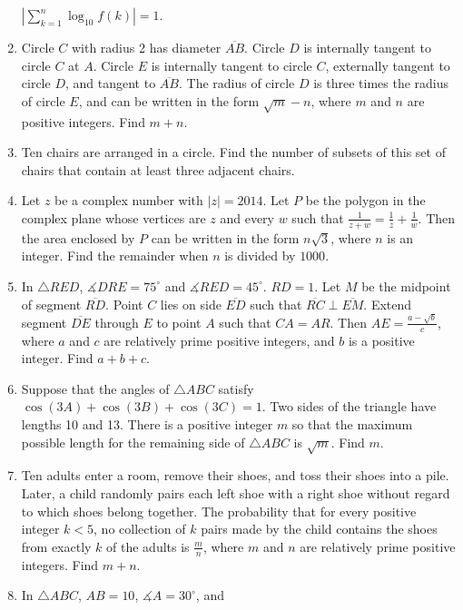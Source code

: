 \documentclass{article}
\begin{document}
\begin{enumerate}[label=\arabic*., itemsep=0.5em]
\(\left |\sum_{k=1}^n\log_{10}f(k)\right|=1.\)\par \vspace{0.5em}\item Circle \(C\) with radius 2 has diameter \(\overline{AB}\). Circle \(D\) is internally tangent to circle \(C\) at \(A\). Circle \(E\) is internally tangent to circle \(C\), externally tangent to circle \(D\), and tangent to \(\overline{AB}\). The radius of circle \(D\) is three times the radius of circle \(E\), and can be written in the form \(\sqrt{m}-n\), where \(m\) and \(n\) are positive integers. Find \(m+n\).\par \vspace{0.5em}\item Ten chairs are arranged in a circle. Find the number of subsets of this set of chairs that contain at least three adjacent chairs.\par \vspace{0.5em}\item Let \(z\) be a complex number with \(|z|=2014\). Let \(P\) be the polygon in the complex plane whose vertices are \(z\) and every \(w\) such that \(\frac{1}{z+w}=\frac{1}{z}+\frac{1}{w}\). Then the area enclosed by \(P\) can be written in the form \(n\sqrt{3}\), where \(n\) is an integer. Find the remainder when \(n\) is divided by \(1000\).\par \vspace{0.5em}\item In \(\triangle RED\), \(\measuredangle DRE=75^{\circ}\) and \(\measuredangle RED=45^{\circ}\). \( RD=1\). Let \(M\) be the midpoint of segment \(\overline{RD}\). Point \(C\) lies on side \(\overline{ED}\) such that \(\overline{RC}\perp\overline{EM}\). Extend segment \(\overline{DE}\) through \(E\) to point \(A\) such that \(CA=AR\). Then \(AE=\frac{a-\sqrt{b}}{c}\), where \(a\) and \(c\) are relatively prime positive integers, and \(b\) is a positive integer. Find \(a+b+c\).\par \vspace{0.5em}\item Suppose that the angles of \(\triangle ABC\) satisfy \(\cos(3A)+\cos(3B)+\cos(3C)=1\). Two sides of the triangle have lengths 10 and 13. There is a positive integer \(m\) so that the maximum possible length for the remaining side of \(\triangle ABC\) is \(\sqrt{m}\). Find \(m\).\par \vspace{0.5em}\item Ten adults enter a room, remove their shoes, and toss their shoes into a pile. Later, a child randomly pairs each left shoe with a right shoe without regard to which shoes belong together. The probability that for every positive integer \(k<5\), no collection of \(k\) pairs made by the child contains the shoes from exactly \(k\) of the adults is \(\frac{m}{n}\), where \(m\) and \(n\) are relatively prime positive integers. Find \(m+n\).\par \vspace{0.5em}\item In \(\triangle ABC\), \(AB=10\), \(\measuredangle A=30^{\circ}\), and 
\end{enumerate}
\end{document}
